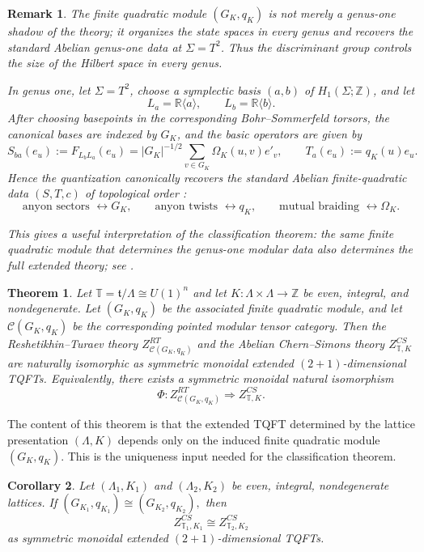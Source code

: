 \documentclass[12pt]{amsart}
\numberwithin{equation}{section}
\newtheorem{theorem}{Theorem}[section]
\newtheorem{corollary}[theorem]{Corollary}
\newtheorem*{remark}{Remark}
\begin{document}
\begin{remark}
The finite quadratic module $(G_K,q_K)$ is not merely a genus-one shadow of the
theory; it organizes the state spaces in every genus and recovers the standard
Abelian genus-one data at $\Sigma=T^2$. Thus the discriminant group controls the size of the Hilbert space in every
genus.

In genus one, let $\Sigma=T^2$, choose a symplectic basis $(a,b)$ of
$H_1(\Sigma;\mathbb Z)$, and let
\[
L_a=\mathbb R\langle a\rangle,\qquad L_b=\mathbb R\langle b\rangle.
\]
After choosing basepoints in the corresponding Bohr--Sommerfeld torsors, the
canonical bases are indexed by $G_K$, and the basic operators are given by
\[
S_{ba}(e_u):=F_{L_bL_a}(e_u)=|G_K|^{-1/2}\sum_{v\in G_K}\Omega_K(u,v)e'_v,
\qquad
T_a(e_u):=q_K(u)e_u.
\]
Hence the quantization canonically recovers the standard Abelian finite-quadratic data $(S,T,c)$ of topological order \cite{wen1990,wenzee1992,Wen2016}:
\[
\text{anyon sectors } \leftrightarrow G_K,\qquad
\text{anyon twists } \leftrightarrow q_K,\qquad
\text{mutual braiding } \leftrightarrow \Omega_K.
\]

This gives a useful interpretation of the classification theorem: the same
finite quadratic module that determines the genus-one modular data also determines the full extended theory; see \cite[Section 5]{Galviz2}.
\end{remark}

\begin{theorem}{\cite[Theorem 4.14]{Galviz3}}
\label{extended-equiv}
Let $\mathbb T=\mathfrak t/\Lambda\cong U(1)^n$ and let
$K:\Lambda\times\Lambda\to\mathbb Z$ be even, integral, and nondegenerate.
Let $(G_K,q_K)$ be the associated finite quadratic module, and let
$\mathcal C(G_K,q_K)$ be the corresponding pointed modular tensor category.
Then the Reshetikhin--Turaev theory $Z^{RT}_{\mathcal C(G_K,q_K)}$
and the Abelian Chern--Simons theory $Z^{CS}_{\mathbb T,K}$ are naturally isomorphic as symmetric monoidal extended $(2+1)$-dimensional
TQFTs. Equivalently, there exists a symmetric monoidal natural isomorphism
\[
\Phi:
Z^{RT}_{\mathcal C(G_K,q_K)}
\Longrightarrow
Z^{CS}_{\mathbb T,K}.
\]
\end{theorem}

The content of  this theorem is that the extended TQFT determined by the lattice presentation $(\Lambda,K)$ depends only on the induced finite quadratic module $(G_K,q_K)$. This is the uniqueness input needed for the classification theorem.

\begin{corollary}
Let $(\Lambda_1,K_1)$ and $(\Lambda_2,K_2)$ be even, integral, nondegenerate
lattices. If $(G_{K_1},q_{K_1})\cong (G_{K_2},q_{K_2}),$ then
\[
Z^{CS}_{\mathbb T_1,K_1}\cong Z^{CS}_{\mathbb T_2,K_2}
\]
as symmetric monoidal extended $(2+1)$-dimensional TQFTs.
\end{corollary}
\end{document}

